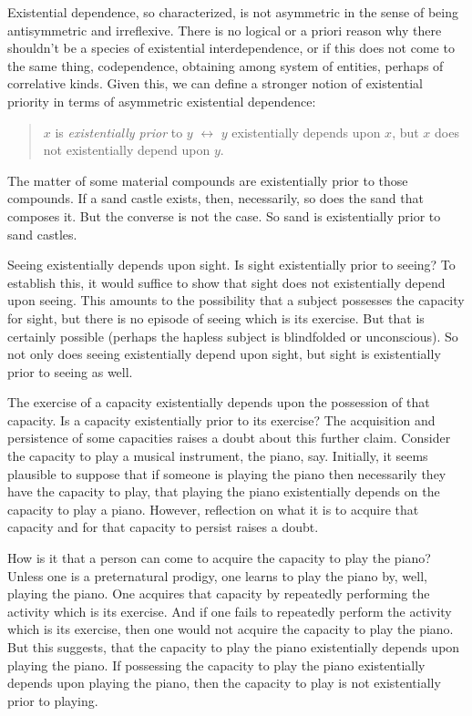 \documentclass[12pt]{article}
\begin{document}
Existential dependence, so characterized, is not asymmetric in the sense of being antisymmetric and irreflexive. There is no logical or a priori reason why there shouldn't be a species of existential interdependence, or if this does not come to the same thing, codependence, obtaining among system of entities, perhaps of correlative kinds. Given this, we can define a stronger notion of existential priority in terms of asymmetric existential dependence:
\begin{quote}
    \( x \) is \emph{existentially prior} to \( y \) \( \leftrightarrow \) \( y \) existentially depends upon \( x \), but \( x \) does not existentially depend upon \( y \).
\end{quote}
The matter of some material compounds are existentially prior to those compounds. If a sand castle exists, then, necessarily, so does the sand that composes it. But the converse is not the case. So sand is existentially prior to sand castles.

Seeing existentially depends upon sight. Is sight existentially prior to seeing? To establish this, it would suffice to show that sight does not existentially depend upon seeing. This amounts to the possibility that a subject possesses the capacity for sight, but there is no episode of seeing which is its exercise. But that is certainly possible (perhaps the hapless subject is blindfolded or unconscious). So not only does seeing existentially depend upon sight, but sight is existentially prior to seeing as well.

The exercise of a capacity existentially depends upon the possession of that capacity. Is a capacity existentially prior to its exercise? The acquisition and persistence of some capacities raises a doubt about this further claim. Consider the capacity to play a musical instrument, the piano, say. Initially, it seems plausible to suppose that if someone is playing the piano then necessarily they have the capacity to play, that playing the piano existentially depends on the capacity to play a piano. However, reflection on what it is to acquire that capacity and for that capacity to persist raises a doubt. 

How is it that a person can come to acquire the capacity to play the piano? Unless one is a preternatural prodigy, one learns to play the piano by, well, playing the piano. One acquires that capacity by repeatedly performing the activity which is its exercise. And if one fails to repeatedly perform the activity which is its exercise, then one would not acquire the capacity to play the piano. But this suggests, that the capacity to play the piano existentially depends upon playing the piano. If possessing the capacity to play the piano existentially depends upon playing the piano, then the capacity to play is not existentially prior to playing. 
\end{document}
